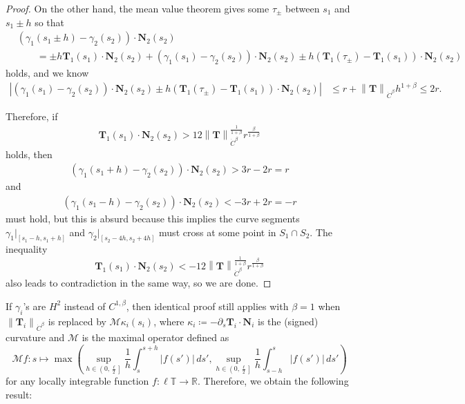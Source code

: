\documentclass[reqno,centertags,12pt]{amsart}
\theoremstyle{definition}
\numberwithin{equation}{section}
\newcommand{\abs}[1]{\left\lvert#1\right\rvert}
\newcommand{\norm}[1]{\left\|#1\right\|}
\newcommand{\bbR}{{\mathbb{R}}}
\newcommand{\bbT}{{\mathbb{T}}}
\begin{document}
\begin{proof}
    On the other hand, the mean value theorem gives some $\tau_{\pm}$ between
    $s_{1}$ and $s_{1}\pm h$ so that
    \begin{align*}
        &(\gamma_{1}(s_{1}\pm h) - \gamma_{2}(s_{2}))\cdot\mathbf{N}_{2}(s_{2}) \\
        &\quad\quad
        = \pm h\mathbf{T}_{1}(s_{1})\cdot\mathbf{N}_{2}(s_{2})
        + (\gamma_{1}(s_{1}) - \gamma_{2}(s_{2}))\cdot\mathbf{N}_{2}(s_{2})
        \pm h(\mathbf{T}_{1}(\tau_{\pm}) - \mathbf{T}_{1}(s_{1}))\cdot\mathbf{N}_{2}(s_{2})
    \end{align*}
    holds, and we know
    \begin{align*}
        \abs{(\gamma_{1}(s_{1}) - \gamma_{2}(s_{2}))\cdot\mathbf{N}_{2}(s_{2})
        \pm h(\mathbf{T}_{1}(\tau_{\pm}) - \mathbf{T}_{1}(s_{1}))\cdot\mathbf{N}_{2}(s_{2})}
        &\leq r + \norm{\mathbf{T}}_{\dot{C}^{\beta}}h^{1+\beta} \leq 2r.
    \end{align*}

    Therefore, if
    \begin{align*}
        \mathbf{T}_{1}(s_{1})\cdot\mathbf{N}_{2}(s_{2})
        > 12\norm{\mathbf{T}}_{\dot{C}^{\beta}}^{\frac{1}{1+\beta}}
        r^{\frac{\beta}{1+\beta}}
    \end{align*}
    holds, then
    \begin{align*}
        (\gamma_{1}(s_{1}+h) - \gamma_{2}(s_{2}))\cdot\mathbf{N}_{2}(s_{2})
        > 3r - 2r = r
    \end{align*}
    and
    \begin{align*}
        (\gamma_{1}(s_{1}-h) - \gamma_{2}(s_{2}))\cdot\mathbf{N}_{2}(s_{2})
        < -3r + 2r = -r
    \end{align*}
    must hold, but this is absurd because this implies the curve segments
    $\gamma_{1}|_{[s_{1}-h,s_{1}+h]}$ and $\gamma_{2}|_{[s_{2}-4h,s_{2}+4h]}$
    must cross at some point in $S_{1}\cap S_{2}$. The inequality
    \[
        \mathbf{T}_{1}(s_{1})\cdot\mathbf{N}_{2}(s_{2}) <
        -12\norm{\mathbf{T}}_{\dot{C}^{\beta}}^{\frac{1}{1+\beta}}
        r^{\frac{\beta}{1+\beta}}
    \]
    also leads to contradiction in the same way, so we are done.
\end{proof}

If $\gamma_{i}$'s are $H^{2}$ instead of $C^{1,\beta}$, then identical
proof still applies with $\beta=1$ when $\norm{\mathbf{T}_{i}}_{\dot{C}^{\beta}}$ is
replaced by $\mathcal{M}\kappa_{i}(s_{i})$, where
$\kappa_{i}\coloneqq -\partial_{s}\mathbf{T}_{i}\cdot\mathbf{N}_{i}$
is the (signed) curvature and $\mathcal{M}$ is the maximal operator defined as
\[
    \mathcal{M}f\colon s\mapsto \max\left(
        \sup_{h\in\left(0,\frac{\ell}{2}\right]}
        \frac{1}{h}\int_{s}^{s+h}\abs{f(s')}\,ds',
        \sup_{h\in\left(0,\frac{\ell}{2}\right]}
        \frac{1}{h}\int_{s-h}^{s}\abs{f(s')}\,ds'
    \right)
\]
for any locally integrable function $f\colon \ell\bbT\to\bbR$. Therefore, we obtain
the following result:
\end{document}
